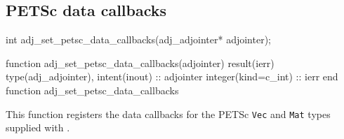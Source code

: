 \subsection{PETSc data callbacks} \label{sec:petsc_callbacks}
\begin{framed}
\begin{minipage}{\columnwidth}
\begin{ccode}
  int adj_set_petsc_data_callbacks(adj_adjointer* adjointer);
\end{ccode}
\begin{fortrancode}
  function adj_set_petsc_data_callbacks(adjointer) result(ierr)
    type(adj_adjointer), intent(inout) :: adjointer
    integer(kind=c_int) :: ierr
  end function adj_set_petsc_data_callbacks
\end{fortrancode}
\end{minipage}
\end{framed}
This function registers the data callbacks for the PETSc \texttt{Vec} and \texttt{Mat} types
supplied with \libadjoint.

